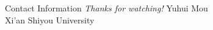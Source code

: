 \documentclass[
 size=14pt,
 paper=smartboard,  %
 mode=present, 		%
 display=slides, 	%
 style=tuliplab,  	%
 pauseslide,
 fleqn,leqno]{powerdot}
\begin{document}
\begin{wideslide}[toc=,bm=]{Contact Information}
\centering
{}
\twocolumn[
lcolwidth=0.35\linewidth,
rcolwidth=0.65\linewidth
]
{
}
{
  \emph{Thanks for watching!}
}
{
Yuhui Mou\\
Xi'an Shiyou University\\

}
\end{wideslide}
\end{document}
